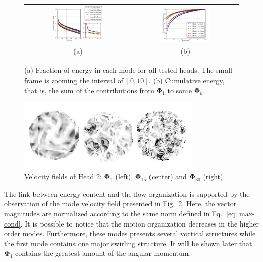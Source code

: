 \documentclass[12pt,a4paper]{article}
\newcommand{\bv}[1]{\mathbf{#1}}
\begin{document}
\begin{figure}[h]
\begin{tabular}{cc}
 \includegraphics[width=0.5\textwidth]{./imgs/energy_spectra.pdf} & \includegraphics[width=0.5\textwidth]{./imgs/cumulative_energy.pdf} \\
(a) & (b)
\end{tabular}
 \caption{(a) Fraction of energy in each mode for all tested heads. The small frame is zooming the interval of $[0,10]$. (b) Cumulative energy, that is, the sum of the contributions from $\bv{\Phi}_1$ to some $\bv{\Phi}_k$.}
 \label{fig: energy_fraction}
\end{figure}


\begin{figure}
 \centering
 \includegraphics[width=0.78\textwidth]{./imgs/scania-modes.png}
 \caption{Velocity fields of Head 2: $\bv{\Phi}_1$ (left), $\bv{\Phi}_{15}$ (center) and $\bv{\Phi}_{30}$ (right).}
 \label{fig: organization}
\end{figure}

The link between energy content and the flow organization is supported by the observation of the mode velocity field presented in Fig.~\ref{fig: organization}. Here, the vector magnitudes are normalized according to the same norm defined in Eq.~\eqref{eq: max-cond}. It is possible to notice that the motion organization decreases in the higher order modes. Furthermore, these modes presents several vortical structures while the first mode contains one major swirling structure. It will be shown later that $\bv{\Phi}_1$ contains the greatest amount of the angular momentum. 
\end{document}
